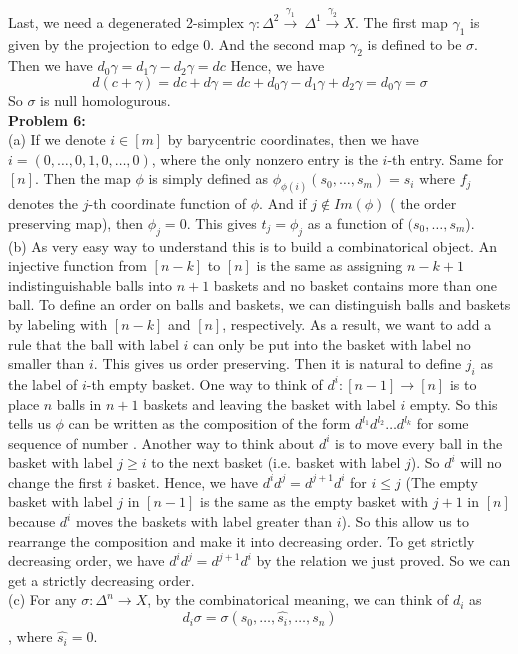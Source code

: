 \documentclass[12pt]{amsart}
\begin{document}
Last, we need a degenerated 2-simplex $\gamma:\Delta^2\xrightarrow{\gamma_1}\  \Delta^1\xrightarrow{\gamma_2} X$. The first map $\gamma_1$ is given by the projection to edge 0. And the second map $\gamma_2$ is defined to be $\sigma$. Then we have $d_0\gamma=d_1\gamma-d_2\gamma=dc$
Hence, we have 
\[d(c+\gamma)=dc+d\gamma=dc+d_0\gamma-d_1\gamma+d_2\gamma=d_0\gamma=\sigma\]
So $\sigma$ is null homologurous.\\
\textbf{Problem 6:}\\
(a) If we denote $i\in[m]$ by barycentric coordinates, then we have $i=(0,\dots,0,1,0,\dots,0)$, where the only nonzero entry is the $i$-th entry. Same for $[n]$. Then the map $\phi$ is simply defined as $\phi_{\phi(i)}(s_0,\dots, s_m)=s_i$ where $f_j$ denotes the $j$-th coordinate function of $\phi$. And if $j\notin Im(\phi)$ ( the order preserving map), then $\phi_j=0$. This gives $t_j=\phi_j$ as a function of $(s_0,\dots,s_m$).\\
(b) As very easy way to understand this is to build a combinatorical object. An injective function from $[n-k]$ to $[n]$ is the same as assigning $n-k+1$ indistinguishable balls into $n+1$ baskets and no basket contains more than one ball. To define an order on balls and baskets, we can distinguish balls and baskets by labeling with $[n-k]$ and $[n]$, respectively. As a result, we want to add a rule that the ball with label $i$ can only be put into the basket with label no smaller than $i$. This gives us order preserving. Then it is natural to define $j_i$ as the label of $i$-th empty basket. One way to think of $d^i:[n-1]\to [n]$ is to place $n$ balls in $n+1$ baskets and leaving the basket with label $i$ empty. So this tells us $\phi$ can be written as the composition of the form $d^{l_1}d^{l_2}\dots d^{l_k}$ for some sequence of number . Another way to think about $d^i$ is to move every ball in the basket with label $j\geq i$ to the next basket (i.e. basket with label $j$). So $d^i$ will no change the first $i$ basket. Hence, we have $d^id^j=d^{j+1}d^i$ for $i\leq j$ (The empty basket with label $j$ in $[n-1]$ is the same as the empty basket with $j+1$ in $[n]$ because $d^i$ moves the baskets with label greater than $i$). So this allow us to rearrange the composition and make it into decreasing order. To get strictly decreasing order, we have $d^id^j=d^{j+1}d^{i}$ by the relation we just proved. So we can get a strictly decreasing order. \\
(c) For any $\sigma:\Delta^n\to X$, by the combinatorical meaning, we can think of $d_i$ as $$d_i\sigma=\sigma(s_0,\dots,\hat{s_i},\dots,s_n)$$, where $\hat{s_i}=0$. 
\end{document}
